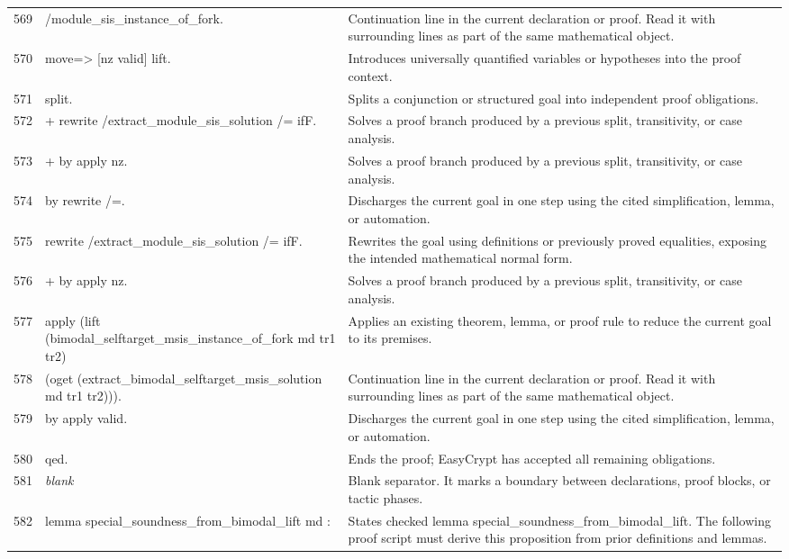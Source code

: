 \documentclass[10pt]{article}
\begin{document}
\begin{longtable}{r L{0.53\textwidth} L{0.37\textwidth}}
569 & {\ttfamily\scriptsize         /module\_sis\_instance\_of\_fork.} & Continuation line in the current declaration or proof.  Read it with surrounding lines as part of the same mathematical object. \\
570 & {\ttfamily\scriptsize move=> [nz valid] lift.} & Introduces universally quantified variables or hypotheses into the proof context. \\
571 & {\ttfamily\scriptsize split.} & Splits a conjunction or structured goal into independent proof obligations. \\
572 & {\ttfamily\scriptsize + rewrite /extract\_module\_sis\_solution /= ifF.} & Solves a proof branch produced by a previous split, transitivity, or case analysis. \\
573 & {\ttfamily\scriptsize   + by apply nz.} & Solves a proof branch produced by a previous split, transitivity, or case analysis. \\
574 & {\ttfamily\scriptsize   by rewrite /=.} & Discharges the current goal in one step using the cited simplification, lemma, or automation. \\
575 & {\ttfamily\scriptsize rewrite /extract\_module\_sis\_solution /= ifF.} & Rewrites the goal using definitions or previously proved equalities, exposing the intended mathematical normal form. \\
576 & {\ttfamily\scriptsize + by apply nz.} & Solves a proof branch produced by a previous split, transitivity, or case analysis. \\
577 & {\ttfamily\scriptsize apply (lift (bimodal\_selftarget\_msis\_instance\_of\_fork md tr1 tr2)} & Applies an existing theorem, lemma, or proof rule to reduce the current goal to its premises. \\
578 & {\ttfamily\scriptsize             (oget (extract\_bimodal\_selftarget\_msis\_solution md tr1 tr2))).} & Continuation line in the current declaration or proof.  Read it with surrounding lines as part of the same mathematical object. \\
579 & {\ttfamily\scriptsize by apply valid.} & Discharges the current goal in one step using the cited simplification, lemma, or automation. \\
580 & {\ttfamily\scriptsize qed.} & Ends the proof; EasyCrypt has accepted all remaining obligations. \\
581 & {\ttfamily\scriptsize \emph{blank}} & Blank separator.  It marks a boundary between declarations, proof blocks, or tactic phases. \\
582 & {\ttfamily\scriptsize lemma special\_soundness\_from\_bimodal\_lift md :} & States checked lemma special\_soundness\_from\_bimodal\_lift.  The following proof script must derive this proposition from prior definitions and lemmas. \\

\end{longtable}
\end{document}

